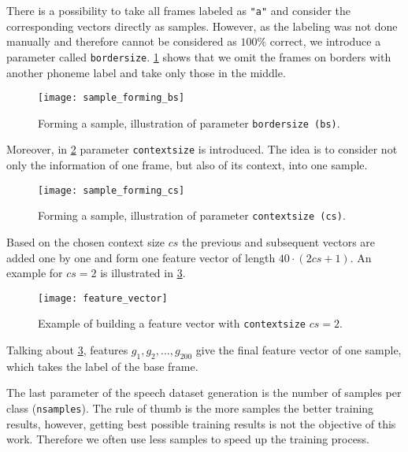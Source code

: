 There is a possibility to take all frames labeled as \texttt{"a"} and consider the corresponding vectors directly as samples. However, as the labeling was not done manually and therefore cannot be considered as $ 100\% $ correct, we introduce a parameter called \texttt{border\textunderscore size}. \cref{fig:methods:sample_forming_bs} shows that we omit the frames on borders with another phoneme label and take only those in the middle.

\begin{figure}[H]
\centering
\texttt{[image: sample\_forming\_bs]}
\caption{Forming a sample, illustration of parameter \texttt{border\textunderscore size (bs)}.}
\label{fig:methods:sample_forming_bs}
\end{figure}

Moreover, in \cref{fig:methods:sample_forming_cs} parameter \texttt{context\textunderscore size} is introduced. The idea is to consider not only the information of one frame, but also of its context, into one sample.

\begin{figure}[H]
\centering
\texttt{[image: sample\_forming\_cs]}
\caption{Forming a sample, illustration of parameter \texttt{context\textunderscore size (cs)}.}
\label{fig:methods:sample_forming_cs}
\end{figure}

Based on the chosen context size $ cs $ the previous and subsequent vectors are added one by one and form one feature vector of length $ 40 \cdot (2cs+1) $. An example for $ cs = 2 $ is illustrated in \cref{fig:methods:feature_vector}.

\begin{figure}[H]
\centering
\texttt{[image: feature\_vector]}
\caption{Example of building a feature vector with \texttt{context\textunderscore size} $ cs = 2 $.}
\label{fig:methods:feature_vector}
\end{figure}

Talking about \cref{fig:methods:feature_vector}, features $ g_1, g_2, ..., g_{200} $ give the final feature vector of one sample, which takes the label of the base frame.

The last parameter of the speech dataset generation is the number of samples per class (\texttt{n\textunderscore samples}). The rule of thumb is the more samples the better training results, however, getting best possible training results is not the objective of this work. Therefore we often use less samples to speed up the training process.

